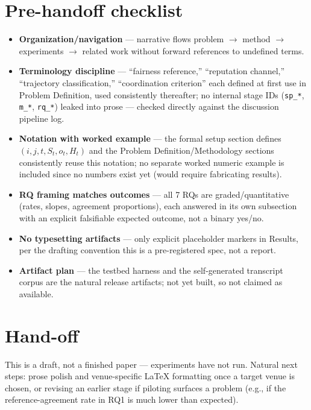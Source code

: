 \documentclass[11pt]{article}
\begin{document}
\section*{Pre-handoff checklist}
\begin{itemize}[leftmargin=1.4em]
\item \textbf{Organization/navigation} --- narrative flows problem $\to$ method $\to$ experiments $\to$ related work without forward references to undefined terms.
\item \textbf{Terminology discipline} --- ``fairness reference,'' ``reputation channel,'' ``trajectory classification,'' ``coordination criterion'' each defined at first use in Problem Definition, used consistently thereafter; no internal stage IDs (\texttt{sp\_*}, \texttt{m\_*}, \texttt{rq\_*}) leaked into prose --- checked directly against the discussion pipeline log.
\item \textbf{Notation with worked example} --- the formal setup section defines $(i, j, t, S_t, o_t, H_t)$ and the Problem Definition/Methodology sections consistently reuse this notation; no separate worked numeric example is included since no numbers exist yet (would require fabricating results).
\item \textbf{RQ framing matches outcomes} --- all 7 RQs are graded/quantitative (rates, slopes, agreement proportions), each answered in its own subsection with an explicit falsifiable expected outcome, not a binary yes/no.
\item \textbf{No typesetting artifacts} --- only explicit placeholder markers in Results, per the drafting convention this is a pre-registered spec, not a report.
\item \textbf{Artifact plan} --- the testbed harness and the self-generated transcript corpus are the natural release artifacts; not yet built, so not claimed as available.
\end{itemize}

\section*{Hand-off}
This is a draft, not a finished paper --- experiments have not run. Natural next steps: prose polish and venue-specific LaTeX formatting once a target venue is chosen, or revising an earlier stage if piloting surfaces a problem (e.g., if the reference-agreement rate in RQ1 is much lower than expected).
\end{document}
